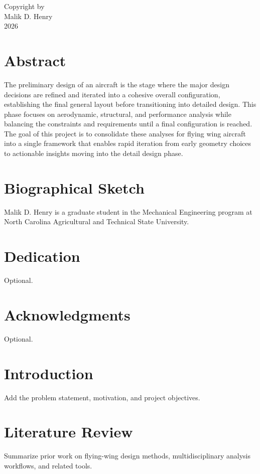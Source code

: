 \documentclass[12pt]{report}
\begin{document}
\clearpage
\thispagestyle{empty}
\begin{center}
  Copyright by\\[0.15in]
  Malik D. Henry\\[0.15in]
  2026
\end{center}


\chapter*{Abstract}
The preliminary design of an aircraft is the stage where the major design decisions are
refined and iterated into a cohesive overall configuration, establishing the final general layout
before transitioning into detailed design. This phase focuses on aerodynamic, structural, and
performance analysis while balancing the constraints and requirements until a final configuration
is reached. The goal of this project is to consolidate these analyses for flying wing aircraft into a
single framework that enables rapid iteration from early geometry choices to actionable insights
moving into the detail design phase.

\chapter*{Biographical Sketch}
Malik D. Henry is a graduate student in the Mechanical Engineering program at North Carolina
Agricultural and Technical State University.

\chapter*{Dedication}
Optional.

\chapter*{Acknowledgments}
Optional.

\tableofcontents
\listoffigures
\listoftables

\clearpage
{}

\chapter{Introduction}
Add the problem statement, motivation, and project objectives.

\chapter{Literature Review}
Summarize prior work on flying-wing design methods, multidisciplinary analysis workflows,
and related tools.
\end{document}
